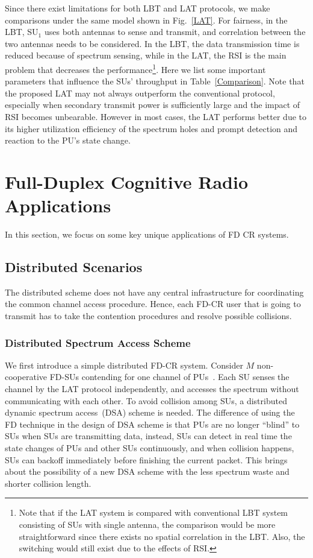 \documentclass[onecolumn,12pt]{IEEEtran}
\begin{document}
Since there exist limitations for both LBT and LAT protocols, we make comparisons under the same model shown in Fig.~\ref{LAT}. For fairness, in the LBT, SU$_1$ uses both antennas to sense and transmit, and correlation between the two antennas needs to be considered. In the LBT, the data transmission time is reduced because of spectrum sensing, while in the LAT, the RSI is the main problem that decreases the performance\footnote{Note that if the LAT system is compared with conventional LBT system consisting of SUs with single antenna, the comparison would be more straightforward since there exists no spatial correlation in the LBT. Also, the switching would still exist due to the effects of RSI.}. Here we list some important parameters that influence the SUs' throughput in Table~\ref{Comparison}. Note that the proposed LAT may not always outperform the conventional protocol, especially when secondary transmit power is sufficiently large and the impact of RSI becomes unbearable. However in most cases, the LAT performs better due to its higher utilization efficiency of the spectrum holes and prompt detection and reaction to the PU's state change.







\section{Full-Duplex Cognitive Radio Applications}


In this section, we focus on some key unique applications of FD CR systems.
\subsection{Distributed Scenarios}

The distributed scheme does not have any central infrastructure for coordinating the common channel access procedure. Hence, each FD-CR user that is going to transmit has to take the contention procedures and resolve possible collisions.



\subsubsection{Distributed Spectrum Access Scheme}
We first introduce a simple distributed FD-CR system. Consider $M$ non-cooperative FD-SUs contending for one channel of PUs~\cite{liao2015icc}. Each SU senses the channel by the LAT protocol independently, and accesses the spectrum without communicating with each other. To avoid collision among SUs, a distributed dynamic spectrum access~(DSA) scheme is needed. The difference of using the FD technique in the design of DSA scheme is that PUs are no longer ``blind'' to SUs when SUs are transmitting data, instead, SUs can detect in real time the state changes of PUs and other SUs continuously, and when collision happens, SUs can backoff immediately before finishing the current packet. This brings about the possibility of a new DSA scheme with the less spectrum waste and shorter collision length.
\end{document}
